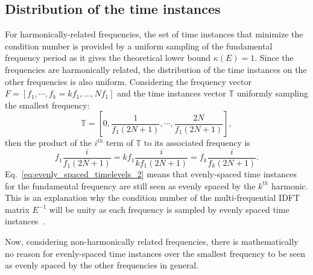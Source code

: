 \subsection{Distribution of the time instances}
For harmonically-related frequencies, the set of time instances
that minimize the condition number is 
provided by a uniform sampling of the fundamental frequency period
as it gives the theoretical lower bound $\kappa (E) = 1$. Since the
frequencies are harmonically related, the distribution of the time
instances on the other frequencies is also uniform. Considering the
frequency vector $F = \left[f_1, \cdots,f_k= kf_1,\ldots,Nf_1 \right]$
and the time instances vector
$\mathbb{T}$ uniformly sampling the smallest frequency:
\begin{equation}
  \mathbb{T} = \left[0, \frac{1}{f_1 (2N+1)}, \cdots,  \frac{2N}{f_1 (2N+1)} \right],
  \label{eq:evenly_spaced_timelevels}
\end{equation}
then the product of the $i^{th}$ term of $\mathbb{T}$ to its
associated frequency is
\begin{equation}
  f_1 \frac{i}{f_1 (2N+1)} = k f_1 \frac{i}{k f_1 (2N+1)} = f_k \frac{i}{f_k (2N+1)}.
  \label{eq:evenly_spaced_timelevels_2}
\end{equation}
Eq.~\eqref{eq:evenly_spaced_timelevels_2} means that evenly-spaced
time instances for the fundamental frequency are still seen as evenly
spaced by the $k^{th}$ harmonic. This is an explanation why the
condition number of the multi-frequential IDFT matrix $E^{-1}$ will be
unity as each frequency is sampled by evenly spaced time
instances~\cite{Brambilla1999}.

Now, considering non-harmonically related frequencies, there is
mathematically no reason for evenly-spaced time instances over the
smallest frequency to be seen as evenly spaced by the other frequencies
in general.

